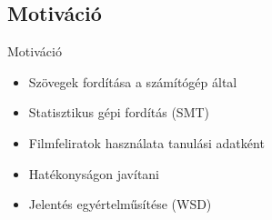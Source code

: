 \subsection{Motiváció}
\begin{frame}{Motiváció}
\begin{itemize}
  \item {Szövegek fordítása a számítógép által}
  \item {Statisztikus gépi fordítás (SMT)}
  \item {Filmfeliratok használata tanulási adatként}
  \item {Hatékonyságon javítani}
  \item {Jelentés egyértelműsítése (WSD)}
  
\end{itemize}

\end{frame}